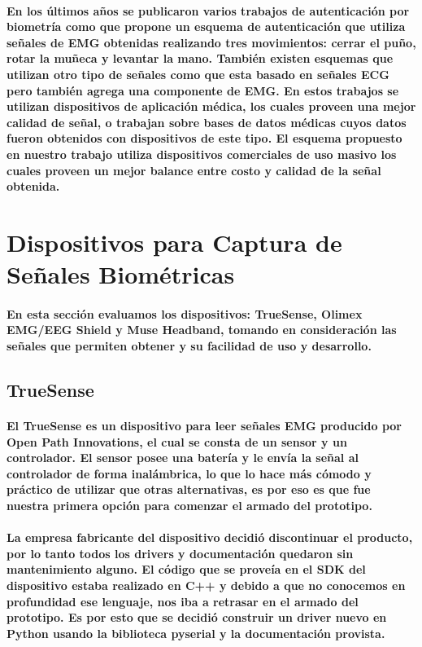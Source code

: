 \documentclass{article}
\begin{document}
\paragraph{
En los últimos años se publicaron varios trabajos de autenticación por biometría como \cite{jinsu2017} que propone un esquema de autenticación que utiliza señales de EMG obtenidas realizando tres movimientos: cerrar el puño, rotar la muñeca y levantar la mano. También existen esquemas que utilizan otro tipo de señales como \cite{nbfnf2015} que esta basado en señales ECG pero también agrega una componente de EMG. En estos trabajos se utilizan dispositivos de aplicación médica, los cuales proveen una mejor calidad de señal, o trabajan sobre bases de datos médicas cuyos datos fueron obtenidos con dispositivos de este tipo. El esquema propuesto en nuestro trabajo utiliza dispositivos comerciales de uso masivo los cuales proveen un mejor balance entre costo y calidad de la señal obtenida.
}

\section{Dispositivos para Captura de Señales Biométricas}

\paragraph{
En esta sección evaluamos los dispositivos: TrueSense, Olimex EMG/EEG Shield y Muse Headband, tomando en consideración las señales que permiten obtener y su facilidad de uso y desarrollo.
}

\subsection{TrueSense}
\paragraph{
El TrueSense es un dispositivo para leer señales EMG producido por Open Path Innovations, el cual se consta de un sensor y un controlador. El sensor posee una batería y le envía la señal al controlador de forma inalámbrica, lo que lo hace más cómodo y práctico de utilizar que otras alternativas, es por eso es que fue nuestra primera opción para comenzar el armado del prototipo.
}
\paragraph{
La empresa fabricante del dispositivo decidió discontinuar el producto, por lo tanto todos los drivers y documentación quedaron sin mantenimiento alguno. El código que se proveía en el SDK del dispositivo estaba realizado en C++ y debido a que no conocemos en profundidad ese lenguaje, nos iba a retrasar en el armado del prototipo. Es por esto que se decidió construir un driver nuevo en Python usando la biblioteca pyserial y la documentación provista.
}
\end{document}
